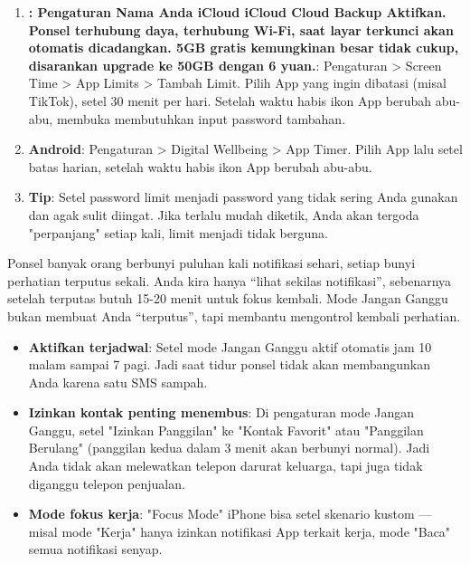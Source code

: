 \begin{enumerate}
  \item \textbf{: Pengaturan Nama Anda iCloud iCloud Cloud Backup Aktifkan. Ponsel terhubung daya, terhubung Wi-Fi, saat layar terkunci akan otomatis dicadangkan. 5GB gratis kemungkinan besar tidak cukup, disarankan upgrade ke 50GB dengan 6 yuan.}: Pengaturan > Screen Time > App Limits > Tambah Limit. Pilih App yang ingin dibatasi (misal TikTok), setel 30 menit per hari. Setelah waktu habis ikon App berubah abu-abu, membuka membutuhkan input password tambahan.
  \item \textbf{Android}: Pengaturan > Digital Wellbeing > App Timer. Pilih App lalu setel batas harian, setelah waktu habis ikon App berubah abu-abu.
  \item \textbf{Tip}: Setel password limit menjadi password yang tidak sering Anda gunakan dan agak sulit diingat. Jika terlalu mudah diketik, Anda akan tergoda "perpanjang" setiap kali, limit menjadi tidak berguna.
\end{enumerate}


Ponsel banyak orang berbunyi puluhan kali notifikasi sehari, setiap bunyi perhatian terputus sekali. Anda kira hanya “lihat sekilas notifikasi”, sebenarnya setelah terputas butuh 15-20 menit untuk fokus kembali. Mode Jangan Ganggu bukan membuat Anda “terputus”, tapi membantu mengontrol kembali perhatian.

\begin{itemize}
  \item \textbf{Aktifkan terjadwal}: Setel mode Jangan Ganggu aktif otomatis jam 10 malam sampai 7 pagi. Jadi saat tidur ponsel tidak akan membangunkan Anda karena satu SMS sampah.
  \item \textbf{Izinkan kontak penting menembus}: Di pengaturan mode Jangan Ganggu, setel "Izinkan Panggilan" ke "Kontak Favorit" atau "Panggilan Berulang" (panggilan kedua dalam 3 menit akan berbunyi normal). Jadi Anda tidak akan melewatkan telepon darurat keluarga, tapi juga tidak diganggu telepon penjualan.
  \item \textbf{Mode fokus kerja}: "Focus Mode" iPhone bisa setel skenario kustom — misal mode "Kerja" hanya izinkan notifikasi App terkait kerja, mode "Baca" semua notifikasi senyap.
\end{itemize}


